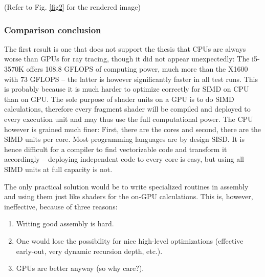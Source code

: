 \documentclass[english,fleqn,10pt,twocolumn]{article}
\begin{document}
(Refer to Fig. \ref{fig2} for the rendered image)

\subsubsection{Comparison conclusion}

The first result is one that does not support the thesis that CPUs are always worse than GPUs for ray tracing, though it did not appear unexpectedly: The i5-3570K offers 108.8 GFLOPS of computing power, much more than the X1600 with
73 GFLOPS -- the latter is however significantly faster in all test runs. This is probably because it is much harder to optimize correctly for SIMD on CPU than on GPU. The sole purpose of shader units on a GPU is to do SIMD
calculations, therefore every fragment shader will be compiled and deployed to every execution unit and may thus use the full computational power. The CPU however is grained much finer: First, there are the cores and second, there are
the SIMD units per core. Most programming languages are by design SISD. It is hence difficult for a compiler to find vectorizable code and transform it accordingly -- deploying independent code to every core is easy, but using all
SIMD units at full capacity is not.

The only practical solution would be to write specialized routines in assembly and using them just like shaders for the on-GPU calculations. This is, however, ineffective, because of three reasons:
\begin{enumerate}
    \item Writing good assembly is hard.
    \item One would lose the possibility for nice high-level optimizations (effective early-out, very dynamic recursion depth, etc.).
    \item GPUs are better anyway (so why care?).
\end{enumerate}



\end{document}
